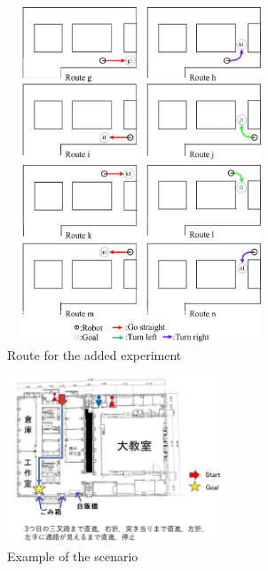 \documentclass{sice-si}
\begin{document}
\begin{figure}[htbp]
    \centering
     \includegraphics[height=100mm,width=80mm]{./figs/newroute.png}
     \caption{Route for the added experiment}\label{fig:newroute}
\end{figure}

\begin{figure}[h!]
    \centering
     \includegraphics[height=50mm]{./figs/scenario24.png}
     \caption{Example of the scenario}\label{fig:scenario24}
\end{figure}
\end{document}
